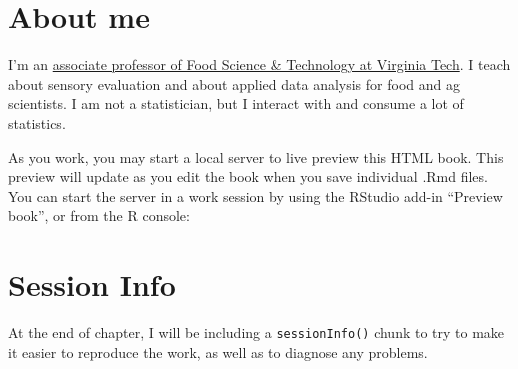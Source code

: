 \documentclass[
]{book}
\begin{document}
\section*{About me}\label{about-me}

I'm an \href{https://www.fst.vt.edu/aboutus/faculty/jlahne.html}{associate professor of Food Science \& Technology at Virginia Tech}. I teach about sensory evaluation and about applied data analysis for food and ag scientists. I am not a statistician, but I interact with and consume a lot of statistics.

As you work, you may start a local server to live preview this HTML book. This preview will update as you edit the book when you save individual .Rmd files. You can start the server in a work session by using the RStudio add-in ``Preview book'', or from the R console:

\section*{Session Info}\label{session-info}

At the end of chapter, I will be including a \texttt{sessionInfo()} chunk to try to make it easier to reproduce the work, as well as to diagnose any problems.
\end{document}
